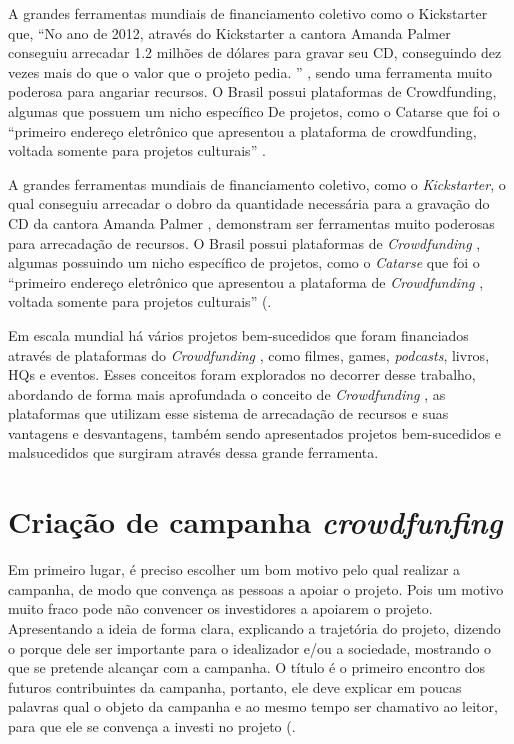 \documentclass{classe_cn}                 %
\begin{document}
A grandes ferramentas mundiais de financiamento coletivo como o Kickstarter que, “No ano de 2012, através do Kickstarter a cantora Amanda Palmer conseguiu arrecadar 1.2 milhões de dólares para gravar seu CD, conseguindo dez vezes mais do que o valor que o projeto pedia. ” \cite[p. 9]{CAVALCANTI:2013}, sendo uma ferramenta muito poderosa para angariar recursos. O Brasil possui plataformas de Crowdfunding, algumas que possuem um nicho específico De projetos, como o Catarse que foi o “primeiro endereço eletrônico que apresentou a plataforma de crowdfunding, voltada somente para projetos culturais” \cite{COCATE:2012}.

A grandes ferramentas mundiais de financiamento coletivo, como o \textit{Kickstarter}, o qual conseguiu arrecadar o dobro da quantidade necessária para a gravação do CD da cantora Amanda Palmer \cite[p. 9]{CAVALCANTI:2013}, demonstram ser ferramentas muito poderosas para arrecadação de recursos. O Brasil possui plataformas de \textit{Crowdfunding} , algumas possuindo um nicho específico de projetos, como o \textit{Catarse} que foi o “primeiro endereço eletrônico que apresentou a plataforma de \textit{Crowdfunding} , voltada somente para projetos culturais” (\cite{COCATE:2012}.

Em escala mundial há vários projetos bem-sucedidos que foram financiados através de plataformas do \textit{Crowdfunding} , como filmes, games, \textit{podcasts}, livros, HQs e eventos. Esses conceitos foram explorados no decorrer desse trabalho, abordando de forma mais aprofundada o conceito de \textit{Crowdfunding} , as plataformas que utilizam esse sistema de arrecadação de recursos e suas vantagens e desvantagens, também sendo apresentados projetos bem-sucedidos e malsucedidos que surgiram através dessa grande ferramenta.

\section{Criação de campanha \textit{crowdfunfing}}

Em primeiro lugar, é preciso escolher um bom motivo pelo qual realizar a campanha, de modo que convença as pessoas a apoiar o projeto. Pois um motivo muito fraco pode não convencer os investidores a apoiarem o projeto. Apresentando a ideia de forma clara, explicando a trajetória do projeto, dizendo o porque dele ser importante para o idealizador e/ou a sociedade, mostrando o que se pretende alcançar com a campanha. O título é o primeiro encontro dos futuros contribuintes da campanha, portanto, ele deve explicar em poucas palavras qual o objeto da campanha e ao mesmo tempo ser chamativo ao leitor, para que ele se convença a investi no projeto (\cite{XAVIER:2016}.
\end{document}
